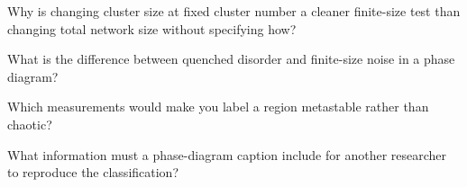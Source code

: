 \begin{conceptquestions}
  \item Why is changing cluster size at fixed cluster number a cleaner finite-size test than changing total network size without specifying how?
  \item What is the difference between quenched disorder and finite-size noise in a phase diagram?
  \item Which measurements would make you label a region metastable rather than chaotic?
  \item What information must a phase-diagram caption include for another researcher to reproduce the classification?
\end{conceptquestions}
